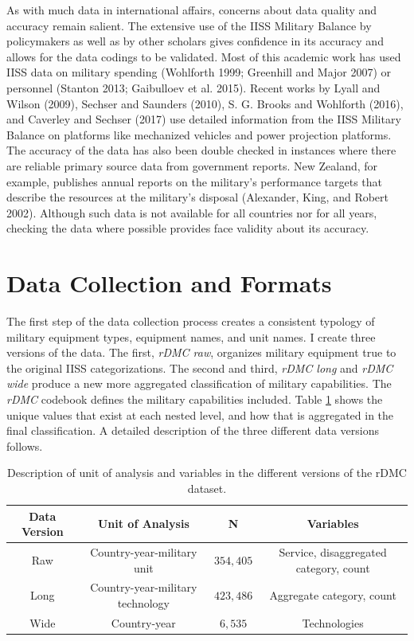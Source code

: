 \documentclass[
]{article}
\begin{document}
As with much data in international affairs, concerns about data quality and accuracy remain salient. The extensive use of the IISS Military Balance by policymakers as well as by other scholars gives confidence in its accuracy and allows for the data codings to be validated. Most of this academic work has used IISS data on military spending (Wohlforth 1999; Greenhill and Major 2007) or personnel (Stanton 2013; Gaibulloev et al. 2015). Recent works by Lyall and Wilson (2009), Sechser and Saunders (2010), S. G. Brooks and Wohlforth (2016), and Caverley and Sechser (2017) use detailed information from the IISS Military Balance on platforms like mechanized vehicles and power projection platforms. The accuracy of the data has also been double checked in instances where there are reliable primary source data from government reports. New Zealand, for example, publishes annual reports on the military's performance targets that describe the resources at the military's disposal (Alexander, King, and Robert 2002). Although such data is not available for all countries nor for all years, checking the data where possible provides face validity about its accuracy.

\hypertarget{data-collection-and-formats}{%
\section{Data Collection and Formats}\label{data-collection-and-formats}}

The first step of the data collection process creates a consistent typology of military equipment types, equipment names, and unit names. I create three versions of the data. The first, \emph{rDMC raw}, organizes military equipment true to the original IISS categorizations. The second and third, \emph{rDMC long} and \emph{rDMC wide} produce a new more aggregated classification of military capabilities. The \emph{rDMC} codebook defines the military capabilities included. Table \ref{table:categories} shows the unique values that exist at each nested level, and how that is aggregated in the final classification. A detailed description of the three different data versions follows.

\begin{singlespace}   
\begin{table}[h]
\centering              
\caption[Categories of military capabilities]{Description of unit of analysis and variables in the different versions of the rDMC dataset.}
  \begin{tabular}{|c|c|c|c|}
    \hline
    \textbf{Data Version} & \textbf{Unit of Analysis} & \textbf{N} & \textbf{Variables} \\
    \hline
    Raw & Country-year-military unit & $354,405$ & Service, disaggregated category, count \\
    \hline
    Long & Country-year-military technology & $423,486$ & Aggregate category, count \\
    \hline
    Wide & Country-year & $6,535$ & Technologies \\
    \hline
\end{tabular}
\label{table:categories}
\end{table}
\end{singlespace}
\end{document}
